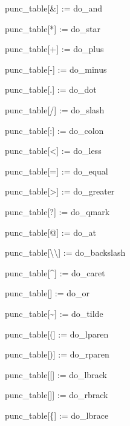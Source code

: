 {\ttfamily\mdseries
\ \ \ punc\_table[{\textquotedbl}\&{\textquotedbl}] := do\_and}

{\ttfamily\mdseries
\ \ \ punc\_table[{\textquotedbl}*{\textquotedbl}] := do\_star}

{\ttfamily\mdseries
\ \ \ punc\_table[{\textquotedbl}+{\textquotedbl}] := do\_plus}

{\ttfamily\mdseries
\ \ \ punc\_table[{\textquotedbl}-{\textquotedbl}] := do\_minus}

{\ttfamily\mdseries
\ \ \ punc\_table[{\textquotedbl}.{\textquotedbl}] := do\_dot}

{\ttfamily\mdseries
\ \ \ punc\_table[{\textquotedbl}/{\textquotedbl}] := do\_slash}

{\ttfamily\mdseries
\ \ \ punc\_table[{\textquotedbl}:{\textquotedbl}] := do\_colon}

{\ttfamily\mdseries
\ \ \ punc\_table[{\textquotedbl}{\textless}{\textquotedbl}] := do\_less}

{\ttfamily\mdseries
\ \ \ punc\_table[{\textquotedbl}={\textquotedbl}] := do\_equal}

{\ttfamily\mdseries
\ \ \ punc\_table[{\textquotedbl}{\textgreater}{\textquotedbl}] := do\_greater}

{\ttfamily\mdseries
\ \ \ punc\_table[{\textquotedbl}?{\textquotedbl}] := do\_qmark}

{\ttfamily\mdseries
\ \ \ punc\_table[{\textquotedbl}@{\textquotedbl}] := do\_at}

{\ttfamily\mdseries
\ \ \ punc\_table[{\textquotedbl}{\textbackslash}{\textbackslash}{\textquotedbl}] := do\_backslash}

{\ttfamily\mdseries
\ \ \ punc\_table[{\textquotedbl}\^{}{\textquotedbl}] := do\_caret}

{\ttfamily\mdseries
\ \ \ punc\_table[{\textquotedbl}{\textbar}{\textquotedbl}] := do\_or}

{\ttfamily\mdseries
\ \ \ punc\_table[{\textquotedbl}\~{}{\textquotedbl}] := do\_tilde}

{\ttfamily\mdseries
\ \ \ punc\_table[{\textquotedbl}({\textquotedbl}] := do\_lparen}

{\ttfamily\mdseries
\ \ \ punc\_table[{\textquotedbl}){\textquotedbl}] := do\_rparen}

{\ttfamily\mdseries
\ \ \ punc\_table[{\textquotedbl}[{\textquotedbl}] := do\_lbrack}

{\ttfamily\mdseries
\ \ \ punc\_table[{\textquotedbl}]{\textquotedbl}] := do\_rbrack}

{\ttfamily\mdseries
\ \ \ punc\_table[{\textquotedbl}\{{\textquotedbl}] := do\_lbrace}

